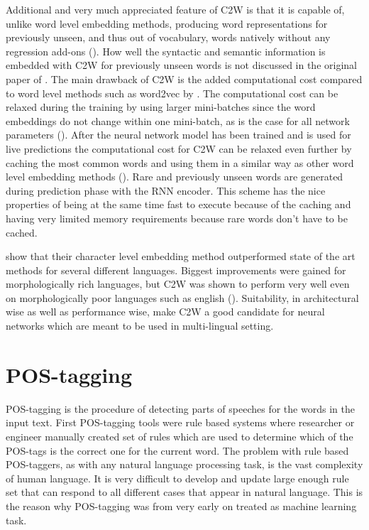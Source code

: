\documentclass[12pt,a4paper,english
]{tutthesis}
\begin{document}
Additional and very much appreciated feature of C2W is that it is capable of, unlike word level embedding methods, producing word representations for previously unseen, and thus out of vocabulary, words natively without any regression add-ons (\cite{Ling2015}). How well the syntactic and semantic information is embedded with C2W for previously unseen words is not discussed in the original paper of \cite{Ling2015}. The main drawback of C2W is the added computational cost compared to word level methods such as word2vec by \cite{Mikolov2013}. The computational cost can be relaxed during the training by using larger mini-batches since the word embeddings do not change within one mini-batch, as is the case for all network parameters (\cite{Ling2015}). After the neural network model has been trained and is used for live predictions the computational cost for C2W can be relaxed even further by caching the most common words and using them in a similar way as other word level embedding methods (\cite{Ling2015}). Rare and previously unseen words are generated during prediction phase with the RNN encoder. This scheme has the nice properties of being at the same time fast to execute because of the caching and having very limited memory requirements because rare words don't have to be cached.

\cite{Ling2015} show that their character level embedding method outperformed state of the art methods for several different languages. Biggest improvements were gained for morphologically rich languages, but C2W was shown to perform very well even on morphologically poor languages such as english (\cite{Ling2015}). Suitability, in architectural wise as well as performance wise, make C2W a good candidate for  neural networks which are meant to be used in multi-lingual setting.

\section{POS-tagging}
POS-tagging is the procedure of detecting parts of speeches for the words in the input text. First POS-tagging tools were rule based systems where researcher or engineer manually created set of rules which are used to determine which of the POS-tags is the correct one for the current word. The problem with rule based POS-taggers, as with any natural language processing task, is the vast complexity of human language. It is very difficult to develop and update large enough rule set that can respond to all different cases that appear in natural language. This is the reason why POS-tagging was from very early on treated as machine learning task.
\end{document}
